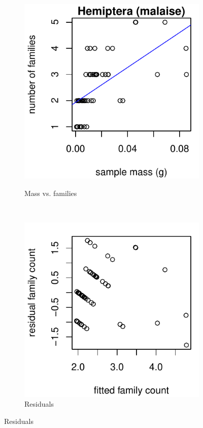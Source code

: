 \documentclass[10pt,letterpaper,twocolumn]{article}
\begin{document}
\begin{figure}[h]
	\centering
	\begin{subfigure}[b]{0.15\textwidth}
		\caption{Mass vs. families}
		\includegraphics[width=\textwidth]{plots/mass-vs-count/scatter/2015_malaise_Hemiptera_mass-vs-count.pdf}
		\label{fig:malaise_hemiptera_scatter}
	\end{subfigure}
	~
	\begin{subfigure}[b]{0.15\textwidth}
		\caption{Residuals}
		\includegraphics[width=\textwidth]{plots/mass-vs-count/residual/2015_malaise_Hemiptera_residual.pdf}

\end{subfigure}
\end{figure}
\end{document}
